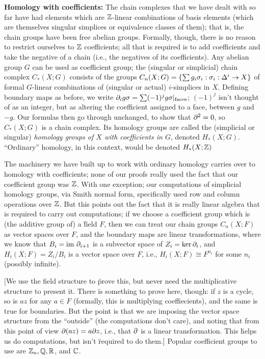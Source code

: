 {\bf Homology with coefficients:} The chain complexes that we have dealt with so far have
had elements which are ${\Bbb Z}$-linear combinations of basis elements (which are
themselves singular simplices or equivalence classes of them); that is, the chain
groups have been free abelian groups. Formally, though, there is no reason to restrict
ourselves to ${\Bbb Z}$ coefficients; all that is required is to add
coefficients and take the negative of a chain (i.e., the negatives of its
coefficients). Any abelian group $G$ can be used as coefficient group; the
(singular or simplicial) chain complex $C_*(X;G)$ consists of the groups
$C_n(X;G)=\{\sum g_i\sigma_i : \sigma_i:\Delta^i\rightarrow X\}$ of formal $G$-linear
combinations of (singular or actual) $i$-simplices in $X$. Defining boundary maps
as before, we write $\partial_i g\sigma = \sum (-1)^jg \sigma|_{\text{faces}}$;
$(-1)^j$ isn't thought of as an integer, but as altering the coefficient
assigned to a face, between $g$ and $-g$. Our formulas then go through unchanged,
to show that $\partial^2=0$, so $C_*(X;G)$ is a chain complex. Its homology groups 
are called the (simplicial or singular) {\it homology groups of $X$ with coefficients in $G$},
denoted $H_*(X;G)$. ``Ordinary'' homology, in this context, would be denoted $H_*(X;{\Bbb Z})$

\ssk

The machinery we have built up to work with ordinary homology carries over to homology
with coefficients; none of our proofs really used the fact that our coefficient group was ${\Bbb Z}$.
With one exception; our computations of simplicial homology groups, via Smith normal form,
specifically used row and column operations over ${\Bbb Z}$. But this points out the fact that
it is really linear algebra that is required to carry out computations; if we choose a coefficient
group which is (the additive group of) a \u{field} $F$, then we can treat our chain groups
$C_n(X;F)$ as vector spaces over $F$, and the boundary maps are linear
transformations, where we know that $B_i=\text{im}\ \partial_{i+1}$ is a subvector space of 
$Z_i=\ker\partial_i$, and $H_i(X;F)=Z_i/B_i$ is a vector space over $F$, i.e., 
$H_i(X;F)\cong F^{n_i}$ for some $n_i$ (possibly infinite). 

\vfill
\eject

[We use the field structure to \u{prove} this, but never need the 
multiplicative structure to present it. There \u{is} something to prove
here, though: if $z$ is a cycle, so is $az$ for any $a\in F$ (formally, this is multiplying 
coeffiecients), and the same is true for boundaries. But the point is that we are imposing
the vector space structure from the ``outside'' (the computations don't care), and noting
that from this point of view $\partial(az)=a\partial z$, i.e., that $\partial$ is a linear transformation.
This \u{helps} us do computations, but isn't \u{required} to do them.] Popular coefficient
groups to use are ${\Bbb Z}_n,{\Bbb Q},{\Bbb R}$, and ${\Bbb C}$.

